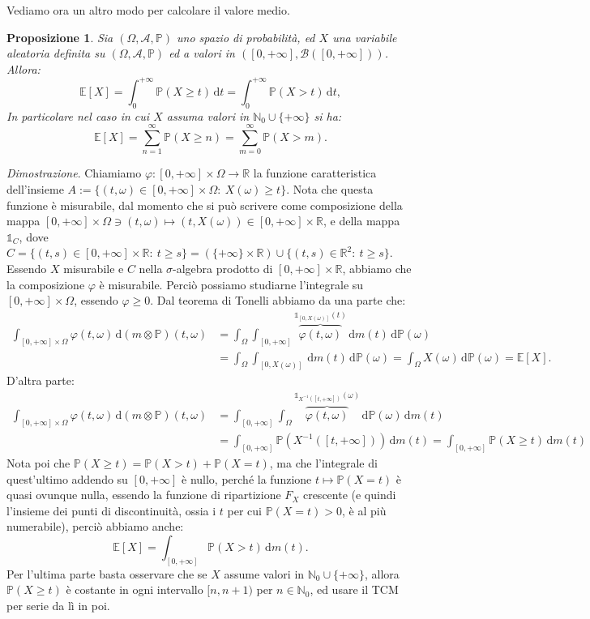 \documentclass[11pt]{book}
\makeatletter
\theoremstyle{Definizione}
\theoremstyle{TeoremaProposizioneLemmaCorollario}
\newtheorem{mypropo}[myteo]{Proposizione}
\theoremstyle{OsservazioneNota}
\renewenvironment{proof}[1][\proofname]{\par
  \normalfont \topsep6\p@\@plus6\p@\relax
  \trivlist
  \item[\hskip\labelsep
        \itshape
    #1\@addpunct{.}]\ignorespaces
}{%
  \endtrivlist\@endpefalse
}
\newcommand{\R}{\mathbb{R}}
\newcommand{\N}{\mathbb{N}}
\renewcommand{\P}{\mathbb{P}}
\renewcommand{\d}{\mathrm{d}}
\newcommand{\dt}{\,\d t}
\newcommand{\dP}{\,\d \P}
\newcommand{\E}{\mathbb{E}}
\newcommand{\uno}[1]{\mathds{1}_{#1}}
\renewenvironment{proof}{\textsl{Dimostrazione}.}{}
\makeatother
\begin{document}
Vediamo ora un altro modo per calcolare il valore medio.
\begin{boxpro}
\begin{mypropo}\label{pro:FormulaAlternativaValorMedio}
Sia $(\Omega,\mathcal{A},\P)$ uno spazio di probabilità, ed $X$ una variabile aleatoria definita su $(\Omega,\mathcal{A},\P)$ ed a valori in $([0,+\infty],\mathcal{B}([0,+\infty]))$. Allora:
$$
\E[X] = \int_0^{+\infty} \P(X \geq t) \dt = \int_0^{+\infty} \P(X > t)\dt,
$$
In particolare nel caso in cui $X$ assuma valori in $\N_0 \cup \{+\infty\}$ si ha:
$$
\E[X] = \sum_{n = 1}^\infty \P(X \geq n) = \sum_{m = 0}^\infty \P(X > m).
$$
\end{mypropo}
\tcblower
\begin{proof}
Chiamiamo $\varphi:[0,+\infty]\times \Omega \longrightarrow \R$ la funzione caratteristica dell'insieme $A:= \{(t,\omega)\in [0,+\infty]\times \Omega:\ X(\omega) \geq t\}$. Nota che questa funzione è misurabile, dal momento che si può scrivere come composizione della mappa $[0,+\infty]\times \Omega \ni (t,\omega) \longmapsto (t,X(\omega))\in [0,+\infty]\times \R$, e della mappa $\uno{C}$, dove $C = \{(t,s)\in [0,+\infty]\times \R:\ t \geq s\} = (\{+\infty\}\times \R)\cup \{(t,s)\in \R^2:\ t \geq s\}$. Essendo $X$ misurabile e $C$ nella $\sigma$-algebra prodotto di $[0,+\infty]\times \R$, abbiamo che la composizione $\varphi$ è misurabile. Perciò possiamo studiarne l'integrale su $[0,+\infty]\times \Omega$, essendo $\varphi \geq 0$. Dal teorema di Tonelli abbiamo da una parte che:
\begin{align*}
\int_{[0,+\infty]\times \Omega} \varphi(t,\omega) \,\d(m\otimes \P)(t,\omega) &= \int_\Omega \int_{[0,+\infty]} \overbrace{\varphi(t,\omega)}^{\uno{[0,X(\omega)]}(t)} \, \d m(t)\,\d\P(\omega) \\
&= \int_\Omega \int_{[0,X(\omega)]} \,\d m(t) \dP(\omega) = \int_\Omega X(\omega)\dP(\omega) = \E[X].
\end{align*}
D'altra parte:
\begin{align*}
\int_{[0,+\infty]\times \Omega} \varphi(t,\omega) \,\d(m\otimes \P)(t,\omega) &= \int_{[0,+\infty]} \int_\Omega \overbrace{\varphi(t,\omega)}^{\uno{X^{-1}([t,+\infty])}(\omega)}\dP(\omega)\,\d m (t) \\
&= \int_{[0,+\infty]} \P(X^{-1}([t,+\infty])) \, \d m(t) = \int_{[0,+\infty]} \P(X \geq t)\,\d m(t)
\end{align*}
Nota poi che $\P(X \geq t) = \P(X > t) + \P(X = t)$, ma che l'integrale di quest'ultimo addendo su $[0,+\infty]$ è nullo, perché la funzione $t \longmapsto \P(X = t)$ è quasi ovunque nulla, essendo la funzione di ripartizione $F_X$ crescente (e quindi l'insieme dei punti di discontinuità, ossia i $t$ per cui $\P(X = t) > 0$, è al più numerabile), perciò abbiamo anche:
$$
\E[X] = \int_{[0,+\infty]} \P(X > t) \, \d m(t).
$$
Per l'ultima parte basta osservare che se $X$ assume valori in $\N_0 \cup \{+\infty\}$, allora $\P(X \geq t)$ è costante in ogni intervallo $[n,n+1)$ per $n\in \N_0$, ed usare il TCM per serie da lì in poi.
\end{proof}
\end{boxpro}
\end{document}
